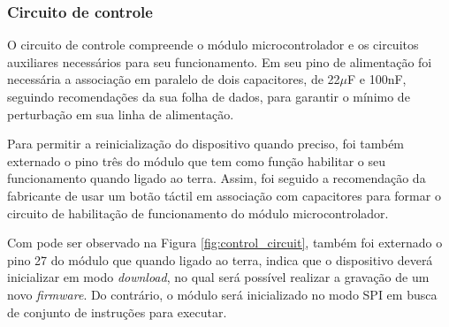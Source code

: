     \begin{figure}[h!]
            \captionsetup{width=7cm}
   \end{figure}  

\newpage

\subsubsection{Circuito de controle}


O circuito de controle compreende o módulo microcontrolador e os circuitos auxiliares necessários para seu funcionamento. Em seu pino de alimentação foi necessária a associação em paralelo de dois capacitores, de 22$\mu$F e 100nF, seguindo recomendações da sua folha de dados, para garantir o mínimo de perturbação em sua linha de alimentação. 

Para permitir a reinicialização do dispositivo quando preciso, foi também externado o pino três do módulo que tem como função habilitar o seu funcionamento quando ligado ao terra. Assim, foi seguido a recomendação da fabricante de usar um botão táctil em associação com capacitores para formar o circuito de habilitação de funcionamento do módulo microcontrolador.

Com pode ser observado na Figura \ref{fig:control_circuit}, também foi externado o pino 27 do módulo que quando ligado ao terra, indica que o dispositivo deverá inicializar em modo \textit{download}, no qual será possível realizar a gravação de um novo \textit{firmware}. Do contrário, o módulo será inicializado no modo \gls{SPI} em busca de conjunto de instruções para executar. 

